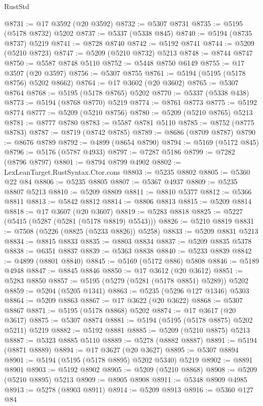 \begin{lexlean}{RustStd}
\begin{coremodule}
@8731 := @17 @3592 (@20 @3592)
@8732 := @5307 @8731
@8735 := @5195 (@5178 @8732) @5202
@8737 := @5337 (@5338 @845)
@8740 := @5194 (@8735 @8737) @5219
@8741 := @8728 @8740
@8742 := @5192 @8741
@8744 := @5209 (@5210 @8723)
@8747 := @5209 (@5210 @8732) @5213
@8748 := @8744 @8747
@8750 := @5587 @8748 @5110
@8752 := @5448 @8750 @6149
@8755 := @17 @3597 (@20 @3597)
@8756 := @5307 @8755
@8761 := @5194 (@5195 (@5178 @8756) @5202 @8662)
@8764 := @17 @3602 (@20 @3602)
@8765 := @5307 @8764
@8768 := @5195 (@5178 @8765) @5202
@8770 := @5337 (@5338 @438)
@8773 := @5194 (@8768 @8770) @5219
@8774 := @8761 @8773
@8775 := @5192 @8774
@8777 := @5209 (@5210 @8756)
@8780 := @5209 (@5210 @8765) @5213
@8781 := @8777 @8780
@8783 := @5587 @8781 @5110
@8785 := @8752 (@8775 @8783)
@8787 := @8719 (@8742 @8785)
@8789 := @8686 (@8709 @8787)
@8790 := @8676 @8789
@8792 := @4899 (@8654 @8790)
@8794 := @5169 (@5172 @845)
@8796 := @5176 (@5787 @4933)
@8797 := @7287 @5186
@8799 := @7282 (@8796 @8797)
@8801 := @8794 @8799 @4902
@8802 := LexLeanTarget.RustSyntax.Ctor.cons
@8803 := @5235 @8802
@8805 := @5360 @22 @84
@8806 := @5235 @8805
@8807 := @5367 @4937
@8809 := @5235 @8807 @5213
@8810 := @5209 @8809
@8811 := @8810 @5377
@8812 := @5366 @8811
@8813 := @5842 @8812
@8814 := @8806 @8813
@8815 := @5209 @8814
@8818 := @17 @3607 (@20 @3607)
@8819 := @5283 @8818
@8825 := @5227 (@5415 (@5287 (@5281 (@5178 @8819) @5543)))
@8826 := @5210 @8819
@8831 := @7508 (@5226 (@8825 (@5233 @8826)) @5258)
@8833 := @5209 @8831 @5213
@8834 := @8815 @8833
@8835 := @8803 @8834
@8837 := @5209 @8835 @5378
@8838 := @6351 @8837
@8839 := @5363 @8838
@8840 := @5233 @8839
@8842 := @4899 (@8801 @8840)
@8845 := @5169 (@5172 @886) @5808
@8846 := @5189 @4948
@8847 := @8845 @8846
@8850 := @17 @3612 (@20 @3612)
@8851 := @5283 @8850
@8857 := @5195 (@5279 (@5281 (@5178 @8851) @5289)) @5202
@8859 := @5204 (@5205 @1341)
@8863 := @5235 (@5296 @127 @1346) @5303
@8864 := @5209 @8863
@8867 := @17 @3622 (@20 @3622)
@8868 := @5307 @8867
@8871 := @5195 (@5178 @8868) @5202
@8874 := @17 @3617 (@20 @3617)
@8875 := @5307 @8874
@8881 := @5194 (@5195 (@5178 @8875) @5202 @5211) @5219
@8882 := @5192 @8881
@8885 := @5209 (@5210 @8875) @5213
@8887 := @5323 @8885 @5110
@8889 := @5278 (@8882 @8887)
@8891 := @5194 (@8871 @8889)
@8894 := @17 @3627 (@20 @3627)
@8895 := @5307 @8894
@8901 := @5194 (@5195 (@5178 @8895) @5202 @5340) @5219
@8902 := @8891 @8901
@8903 := @5192 @8902
@8905 := @5209 (@5210 @8868)
@8908 := @5209 (@5210 @8895) @5213
@8909 := @8905 @8908
@8911 := @5348 @8909 @4985
@8913 := @5278 (@8903 @8911)
@8914 := @5209 @8913
@8916 := @5360 @127 @84

\end{coremodule}
\end{lexlean}
